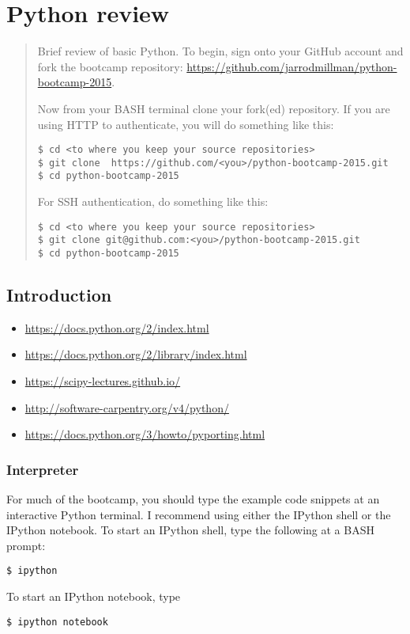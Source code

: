 \chapter{Python review}

\begin{abstract}
Brief review of basic Python. To begin, sign onto your GitHub account and fork
the bootcamp repository: \url{https://github.com/jarrodmillman/python-bootcamp-2015}.

Now from your BASH terminal clone your fork(ed) repository.  If you are using HTTP to
authenticate, you will do something like this:
\begin{verbatim}
$ cd <to where you keep your source repositories>
$ git clone  https://github.com/<you>/python-bootcamp-2015.git
$ cd python-bootcamp-2015 
\end{verbatim}
For SSH authentication, do something like this:
\begin{verbatim}
$ cd <to where you keep your source repositories>
$ git clone git@github.com:<you>/python-bootcamp-2015.git
$ cd python-bootcamp-2015 
\end{verbatim}
\end{abstract}

\section{Introduction}
\begin{itemize}
\item \url{https://docs.python.org/2/index.html}
\item \url{https://docs.python.org/2/library/index.html}
\item \url{https://scipy-lectures.github.io/}
\item \url{http://software-carpentry.org/v4/python/}
\item \url{https://docs.python.org/3/howto/pyporting.html}
\end{itemize}

\subsection{Interpreter}

For much of the bootcamp, you should type the example code snippets at an
interactive Python terminal.  I recommend using either the IPython shell or the
IPython notebook.  To start an IPython shell, type the following at a BASH
prompt:
\begin{verbatim}
$ ipython
\end{verbatim}
To start an IPython notebook, type
\begin{verbatim}
$ ipython notebook
\end{verbatim}

